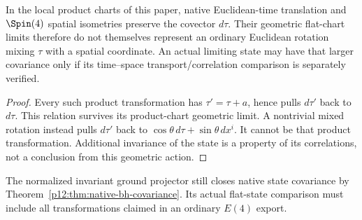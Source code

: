 \documentclass[12pt,a4paper]{article}
\begin{document}
\begin{proposition}
\label{p12:prop:v2210-lit-covariance-scope}
In the local product charts of this paper, native Euclidean-time translation
and $\Spin(4)$ spatial isometries preserve the covector $d\tau$.
Their geometric flat-chart limits therefore do not themselves represent
an ordinary Euclidean rotation mixing $\tau$ with a spatial coordinate.
An actual limiting state may have that larger covariance only if its
time--space transport/correlation comparison is separately verified.
\end{proposition}
\begin{proof}
Every such product transformation has $\tau' =\tau+a$, hence
pulls $d\tau'$ back to $d\tau$. This relation survives its product-chart
geometric limit. A nontrivial mixed rotation instead pulls $d\tau'$ back
to $\cos\theta\,d\tau+\sin\theta\,dx^i$. It cannot be that product
transformation. Additional invariance of the state is a property of its
correlations, not a conclusion from this geometric action.
\end{proof}
The normalized invariant ground projector still closes native state
covariance by Theorem~\ref{p12:thm:native-bh-covariance}. Its actual
flat-state comparison must include all transformations claimed in an
ordinary $E(4)$ export.


\end{document}

